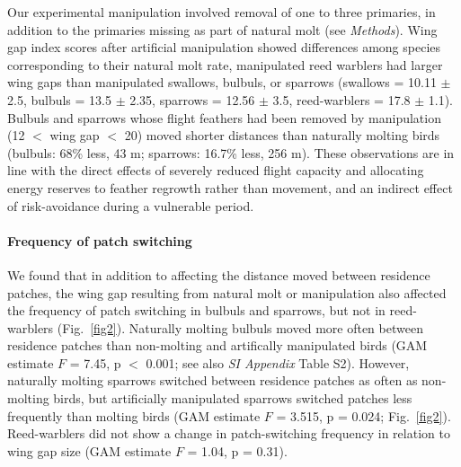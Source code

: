 \begin{refsection}
Our experimental manipulation involved removal of one to three primaries, in addition to the primaries missing as part of natural molt (see \emph{Methods}).
Wing gap index scores after artificial manipulation showed differences among species corresponding to their natural molt rate, manipulated reed warblers had larger wing gaps than manipulated swallows, bulbuls, or sparrows {(swallows = 10.11 $\pm$ 2.5, bulbuls = 13.5 $\pm$ 2.35, sparrows = 12.56 $\pm$ 3.5, reed-warblers = 17.8 $\pm$ 1.1).}
Bulbuls and sparrows whose flight feathers had been removed by manipulation (12 $<$ wing gap $<$ 20) moved shorter distances than naturally molting birds {(bulbuls: 68\% less, 43 m; sparrows: 16.7\% less, 256 m)}.
These observations are in line with the direct effects of severely reduced flight capacity and allocating energy reserves to feather regrowth rather than movement, and an indirect effect of risk-avoidance during a vulnerable period.

\paragraph*{Frequency of patch switching}

We found that in addition to affecting the distance moved between residence patches, the wing gap resulting from natural molt or manipulation also affected the frequency of patch switching in bulbuls and sparrows, but not in reed-warblers (Fig.~\ref{fig2}).
Naturally molting bulbuls moved more often between residence patches than non-molting and artifically manipulated birds (GAM estimate $F$ = 7.45, p $<$ 0.001; see also \textit{SI Appendix} Table S2).
However, naturally molting sparrows switched between residence patches as often as non-molting birds, but artificially manipulated sparrows switched patches less frequently than molting birds (GAM estimate $F$ = 3.515, p = 0.024; Fig.~\ref{fig2}).
Reed-warblers did not show a change in patch-switching frequency in relation to wing gap size (GAM estimate $F$ = 1.04, p = 0.31).


\end{refsection}
